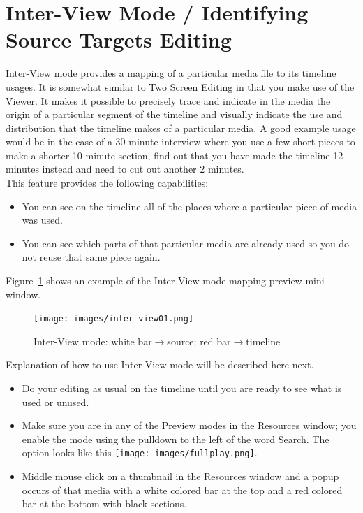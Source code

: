 \section{Inter-View Mode / Identifying Source Targets Editing}%
\label{sec:inter-view_identifying_source_target_editing}

Inter-View mode provides a mapping of a particular media file to its timeline usages. It is somewhat similar to Two Screen Editing in that you make use of the Viewer. It makes it possible to precisely trace and indicate in the media the origin of a particular segment of the timeline and visually indicate the use and distribution that the timeline makes of a particular media.   A good example usage would be in the case of a 30 minute interview where you use a few short pieces to make a shorter 10 minute section, find out that you have made the timeline 12 minutes instead and need to cut out another 2 minutes. \\
This feature provides the following capabilities:
\begin{itemize}
    \item You can see on the timeline all of the places where a particular piece of media was used.
    \item You can see which parts of that particular media are already used so you do not reuse that same 
    piece again.
\end{itemize}
Figure~\ref{fig:inter-view01} shows an example of the Inter-View mode mapping preview mini-window.

\begin{figure}[htpb]
    \centering
    \texttt{[image: images/inter-view01.png]}
    \caption{Inter-View mode: white bar$\rightarrow$source; red bar$\rightarrow$timeline}
    \label{fig:inter-view01}
\end{figure}

Explanation of how to use Inter-View mode will be described here next.

\begin{itemize}
    \item Do your editing as usual on the timeline until you are ready to see what is used or unused.
    \item Make sure you are in any of the Preview modes in the Resources window; you enable the mode using the pulldown to the left of the word Search.  The option looks like this
    \quad \texttt{[image: images/fullplay.png]}.   \item Middle mouse click on a thumbnail in the Resources window and a popup occurs of that media with a
    white colored bar at the top and a red colored bar at the bottom with black sections.
\end{itemize}

